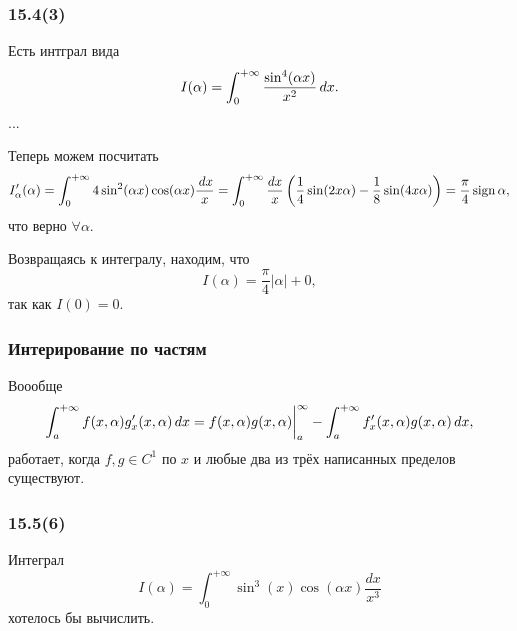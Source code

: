 \subsubsection*{15.4(3)}

Есть интграл вида
\begin{equation*}
    I(\alpha) = \int_{0}^{+\infty} \frac{\sin^4 (\alpha x)}{x^2} \, d x.
\end{equation*}
...

Теперь можем посчитать
\begin{equation*}
    I'_\alpha (\alpha) = \int_{0}^{+\infty} 4 \sin^2 (\alpha x) \cos(\alpha x) \frac{\, d x}{x}
    =
    \int_{0}^{+\infty} \frac{dx}{x} \left(
        \frac{1}{4} \sin (2 x\alpha) - \frac{1}{8} \sin (4 x \alpha)
    \right) = \frac{\pi}{4} \mathop{\mathrm{sign}}\nolimits \alpha,
\end{equation*}
что верно $\forall \alpha$. 

Возвращаясь к интегралу, находим, что
\begin{equation*}
    I(\alpha) = \frac{\pi}{4} |\alpha| + 0,
\end{equation*}
так как $I(0) = 0$.


\subsubsection*{Интерирование по частям}

Воообще 
\begin{equation*}
    \int_{a}^{+\infty}  f(x, \alpha) g'_x (x, \alpha) \, d x 
    =
    f(x, \alpha) g(x, \alpha) \bigg|_a^{\infty} - \int_{a}^{+\infty}  f'_x (x, \alpha) g(x, \alpha) \, d x,
\end{equation*}
работает, когда $f, g \in C^1$ по $x$ и любые два из трёх написанных пределов существуют.



\subsubsection*{15.5(6)}

Интеграл 
\begin{equation*}
    I(\alpha) = \int_{0}^{+\infty}  \sin^3 (x) \cos (\alpha x) \frac{dx}{x^3}
\end{equation*}
хотелось бы вычислить.

